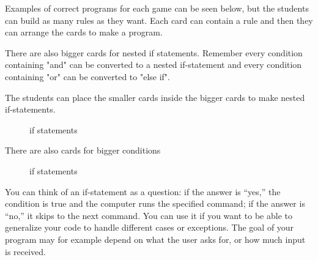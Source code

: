 Examples of correct programs for each game can be seen below, but the students can build as many rules as they want. Each card can contain a rule and then they can arrange the cards to make a program. 


There are also bigger cards for nested if statements. Remember every condition containing "and" can be converted to a nested if-statement and every condition containing "or" can be converted to "else if". 

The students can place the smaller cards inside the bigger cards to make nested if-statements.

\begin{figure}[H]
    \caption{if statements}
\end{figure}

There are also cards for bigger conditions

\begin{figure}[H]
    \caption{if statements}
\end{figure}









You can think of an if-statement as a question: if the answer is “yes,” the condition is true and the computer runs the specified command; if the answer is “no,” it skips to the next command. You can use it if you want to be able to generalize your code to handle different cases or exceptions. The goal of your program may for example depend on what the user asks for, or how much input is received. 

